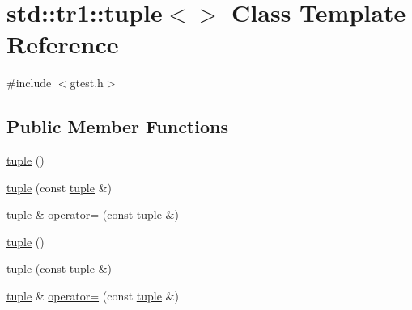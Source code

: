 \hypertarget{classstd_1_1tr1_1_1tuple_3_4}{\section{std\-:\-:tr1\-:\-:tuple$<$$>$ Class Template Reference}
\label{classstd_1_1tr1_1_1tuple_3_4}
}


{\ttfamily \#include $<$gtest.\-h$>$}

\subsection*{Public Member Functions}
\begin{DoxyCompactItemize}
\item 
\hyperlink{classstd_1_1tr1_1_1tuple_3_4_adcea1a41d0521157971339d279aad469}{tuple} ()
\item 
\hyperlink{classstd_1_1tr1_1_1tuple_3_4_aa857599acb126134e29dc5e53fd9d1a7}{tuple} (const \hyperlink{classstd_1_1tr1_1_1tuple}{tuple} \&)
\item 
\hyperlink{classstd_1_1tr1_1_1tuple}{tuple} \& \hyperlink{classstd_1_1tr1_1_1tuple_3_4_a93ddab6f662662fc49635608619150c8}{operator=} (const \hyperlink{classstd_1_1tr1_1_1tuple}{tuple} \&)
\item 
\hyperlink{classstd_1_1tr1_1_1tuple_3_4_adcea1a41d0521157971339d279aad469}{tuple} ()
\item 
\hyperlink{classstd_1_1tr1_1_1tuple_3_4_aa857599acb126134e29dc5e53fd9d1a7}{tuple} (const \hyperlink{classstd_1_1tr1_1_1tuple}{tuple} \&)
\item 
\hyperlink{classstd_1_1tr1_1_1tuple}{tuple} \& \hyperlink{classstd_1_1tr1_1_1tuple_3_4_a93ddab6f662662fc49635608619150c8}{operator=} (const \hyperlink{classstd_1_1tr1_1_1tuple}{tuple} \&)
\end{DoxyCompactItemize}


